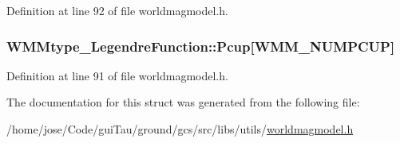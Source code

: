 Definition at line 92 of file worldmagmodel.\-h.

\hypertarget{struct_w_m_mtype___legendre_function_a5badc4162d0641c9de51a11bf49d2f71}{
\subsubsection[{Pcup}]{ W\-M\-Mtype\-\_\-\-Legendre\-Function\-::\-Pcup\mbox{[}W\-M\-M\-\_\-\-N\-U\-M\-P\-C\-U\-P\mbox{]}}}\label{struct_w_m_mtype___legendre_function_a5badc4162d0641c9de51a11bf49d2f71}


Definition at line 91 of file worldmagmodel.\-h.



The documentation for this struct was generated from the following file\-:\begin{DoxyCompactItemize}
\item 
/home/jose/\-Code/gui\-Tau/ground/gcs/src/libs/utils/\hyperlink{worldmagmodel_8h}{worldmagmodel.\-h}\end{DoxyCompactItemize}
